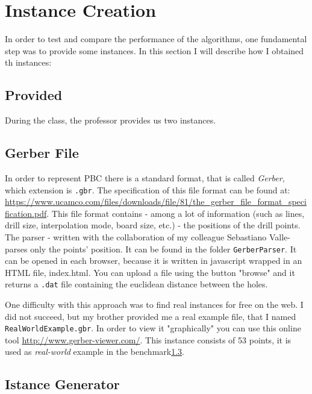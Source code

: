 \section{Instance Creation}
In order to test and compare the performance of the algorithms, one fundamental step
was to provide some instances.
In this section I will describe how I obtained th instances:
\subsection{Provided}
During the class, the professor provides us two instances.
\subsection{Gerber File}

In order to represent PBC there is a standard format, that is called \emph{Gerber}, which extension is \verb|.gbr|.
The specification of this file format can be found at: \url{https://www.ucamco.com/files/downloads/file/81/the_gerber_file_format_specification.pdf}. This file format
contains - among a lot of information (such as lines, drill size, interpolation mode, board size, etc.) -
the positions of the drill points.
The parser - written with the collaboration of my colleague Sebastiano Valle- parses only the points' position. It can be found in the folder \verb|GerberParser|. It can be opened in each browser, because it is written in javascript wrapped in an HTML file, index.html.
You can upload a file using the button "browse" and it returns a \verb|.dat| file containing the euclidean distance between the holes.

One difficulty with this approach was to find real instances for free on the web. I did not succeed, but my brother provided me a real example file, that I named
\verb|RealWorldExample.gbr|. In order to view it "graphically" you can use this online tool \url{http://www.gerber-viewer.com/}.
This instance consists of 53 points, it is used as \emph{real-world} example in the benchmark\ref{}.

\subsection{Istance Generator}

